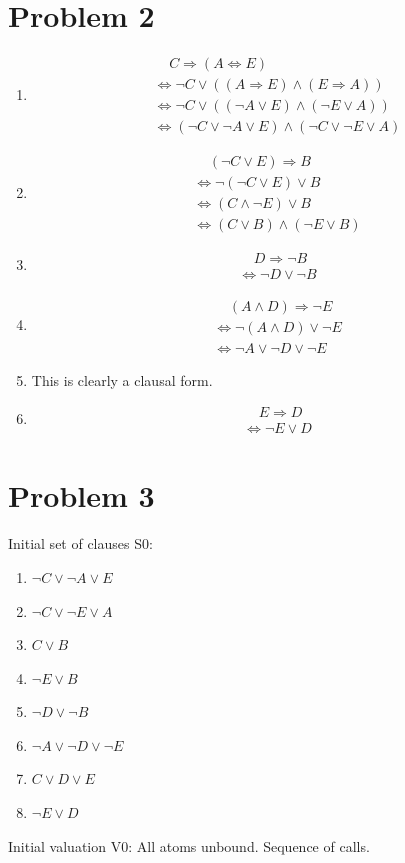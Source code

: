 \documentclass[11pt]{article}
\begin{document}
	\section*{Problem 2}
	\begin{enumerate}[1.]
		\item
			\begin{align*}
				&~~~~~ C\Rightarrow (A\Leftrightarrow E)\\
				&\Leftrightarrow \neg C\vee ((A\Rightarrow E)\land (E\Rightarrow A))\\
				&\Leftrightarrow \neg C\vee ((\neg A\vee E)\land (\neg E\vee A))\\
				&\Leftrightarrow (\neg C\vee \neg A\vee E)\land (\neg C\vee\neg E\vee A)
			\end{align*}
		\item
			\begin{align*}
				&~~~~~ (\neg C \vee E)\Rightarrow B\\
				&\Leftrightarrow \neg(\neg C \vee E)\vee B\\
				&\Leftrightarrow (C\land \neg E)\vee B\\
				&\Leftrightarrow (C\vee B)\land (\neg E\vee B)
			\end{align*}
		\item
			\begin{align*}
				&~~~~~ D\Rightarrow \neg B\\
				&\Leftrightarrow \neg D\vee \neg B
			\end{align*}
		\item
			\begin{align*}
				&~~~~~ (A\land D)\Rightarrow \neg E\\
				&\Leftrightarrow \neg(A\land D)\vee \neg E\\
				&\Leftrightarrow \neg A\vee \neg D\vee \neg E
			\end{align*}
		\item
			This is clearly a clausal form.
		\item
			\begin{align*}
				&~~~~~ E\Rightarrow D\\
				&\Leftrightarrow \neg E\vee D
			\end{align*}
	\end{enumerate}
	\section*{Problem 3}
	Initial set of clauses S0:
	\begin{enumerate}[1.]
		\item $ \neg C\vee \neg A\vee E $
		\item $ \neg C\vee\neg E\vee A $
		\item $ C\vee B $
		\item $ \neg E\vee B $
		\item $ \neg D\vee \neg B $
		\item $ \neg A\vee \neg D\vee \neg E $
		\item $ C\vee D\vee E $
		\item $ \neg E\vee D $
	\end{enumerate}
	Initial valuation V0: All atoms unbound. Sequence of calls.
	
\end{document}
